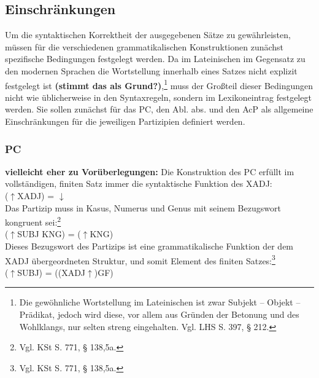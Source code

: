 \documentclass[12pt,a4paper]{article}
\begin{document}
\subsection{Einschränkungen}
Um die syntaktischen Korrektheit der ausgegebenen Sätze zu gewährleisten, müssen für die verschiedenen grammatikalischen Konstruktionen zunächst spezifische Bedingungen festgelegt werden.
Da im Lateinischen im Gegensatz zu den modernen Sprachen die Wortstellung innerhalb eines Satzes nicht explizit festgelegt ist \textbf{(stimmt das als Grund?)},\footnote{Die gewöhnliche Wortstellung im Lateinischen ist zwar Subjekt – Objekt – Prädikat, jedoch wird diese, vor allem aus Gründen der Betonung und des Wohlklangs, nur selten streng eingehalten. Vgl. LHS S. 397, § 212.} muss der Großteil dieser Bedingungen nicht wie üblicherweise in den Syntaxregeln, sondern im Lexikoneintrag festgelegt werden. Sie sollen zunächst für das PC, den Abl. abs. und den AcP als allgemeine Einschränkungen für die jeweiligen Partizipien definiert werden.

\subsubsection{PC}
\textbf{vielleicht eher zu Vorüberlegungen:} Die Konstruktion des PC erfüllt im vollständigen, finiten Satz immer die syntaktische Funktion des XADJ: \\ 
($\uparrow$XADJ) = $\downarrow$ \\
Das Partizip muss in Kasus, Numerus und Genus mit seinem Bezugswort kongruent sei:\footnote{Vgl. KSt S. 771, § 138,5a.}\\
($\uparrow$SUBJ KNG) = ($\uparrow$KNG)\\
Dieses Bezugswort des Partizips ist eine grammatikalische Funktion der dem XADJ übergeordneten Struktur, und somit Element des finiten Satzes:\footnote{Vgl. KSt S. 771, § 138,5a.}\\
($\uparrow$SUBJ) = ((XADJ$\uparrow$)GF) \\
\end{document}
